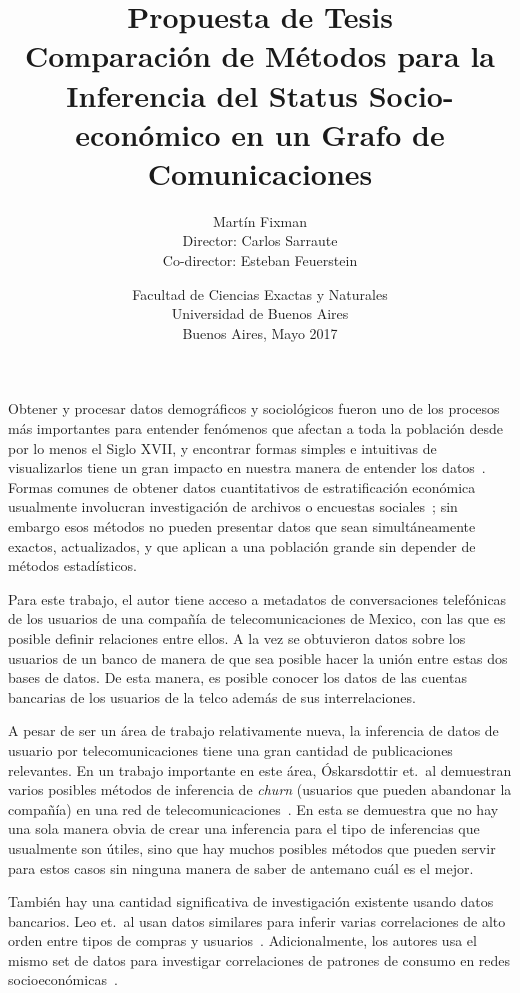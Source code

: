 \documentclass{article}
\title{Propuesta de Tesis\\\vspace{1em}\Large 
Comparación de Métodos para la Inferencia
del Status Socio-económico en un Grafo de Comunicaciones}
\author{{\Large Martín Fixman}\\Director: Carlos Sarraute\\Co-director: Esteban Feuerstein}
\date{{Facultad de Ciencias Exactas y Naturales}\\{Universidad de Buenos Aires}\\Buenos Aires, Mayo 2017}
\begin{document}
\maketitle

\section*{}

Obtener y procesar datos demográficos y sociológicos fueron uno de los procesos más importantes para entender fenómenos que afectan a toda la población desde por lo menos el Siglo XVII, y encontrar formas simples e intuitivas de visualizarlos tiene un gran impacto en nuestra manera de entender los datos~\citep{minard1844,snow1855}. Formas comunes de obtener datos cuantitativos de estratificación económica usualmente involucran investigación de archivos o encuestas sociales~\citep{bulmer1977}; sin embargo esos métodos no pueden presentar datos que sean simultáneamente exactos, actualizados, y que aplican a una población grande sin depender de métodos estadísticos.

Para este trabajo, el autor tiene acceso a metadatos de conversaciones telefónicas de los usuarios de una compañía de telecomunicaciones de Mexico, con las que es posible definir relaciones entre ellos. A la vez se obtuvieron datos sobre los usuarios de un banco de manera de que sea posible hacer la unión entre estas dos bases de datos. De esta manera, es posible conocer los datos de las cuentas bancarias de los usuarios de la telco además de sus interrelaciones.

A pesar de ser un área de trabajo relativamente nueva, la inferencia de datos de usuario por telecomunicaciones tiene una gran cantidad de publicaciones relevantes. En un trabajo importante en este área, Óskarsdottir et.\ al demuestran varios posibles métodos de inferencia de \emph{churn} (usuarios que pueden abandonar la compañía) en una red de telecomunicaciones~\cite{oskarsdottir2016}. En esta se demuestra que no hay una sola manera obvia de crear una inferencia para el tipo de inferencias que usualmente son útiles, sino que hay muchos posibles métodos que pueden servir para estos casos sin ninguna manera de saber de antemano cuál es el mejor.

También hay una cantidad significativa de investigación existente usando datos bancarios. Leo et.\ al usan datos similares para inferir varias correlaciones de alto orden entre tipos de compras y usuarios~\cite{leo2015socioeconomic}. Adicionalmente, los autores usa el mismo set de datos para investigar correlaciones de patrones de consumo en redes socioeconómicas~\cite{leo16correlations}.
\end{document}
